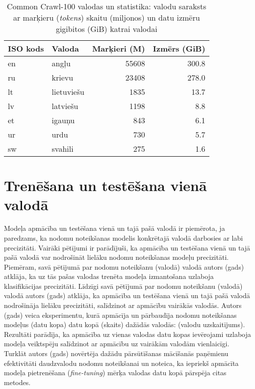 \begin{table}[htbp]
  \centering
  \caption{Common Crawl-100 valodas un statistika: valodu saraksts ar marķieru (\textit{tokens}) skaitu (miljonos) un datu izmēru gigibitos (GiB) katrai valodai}
    \begin{tabular}{llrr} \toprule
    ISO kods &  Valoda & Marķieri (M) & Izmērs (GiB) \\\midrule
    en    &  angļu & 55608 & 300.8 \\
    ru    &  krievu & 23408 & 278.0 \\
    lt    &  lietuviešu & 1835  & 13.7 \\
    lv    &  latviešu & 1198  & 8.8 \\
    et    &  igauņu & 843   & 6.1 \\
    ur    &  urdu & 730   & 5.7 \\
    sw    &  svahili & 275   & 1.6 \\\bottomrule
    \end{tabular}
  \label{tab:cc-100}
\end{table}


\section{Trenēšana un testēšana vienā valodā}

Modeļa apmācība un testēšana vienā un tajā pašā valodā ir piemērota, ja paredzams, ka nodomu noteikšanas modelis konkrētajā valodā darbosies ar labi precizitāti. Vairāki pētījumi ir parādījuši, ka apmācība un testēšana vienā un tajā pašā valodā var nodrošināt lielāku nodomu noteikšanas modeļu precizitāti. Piemēram, savā pētījumā par nodomu noteikšanu (valodā) valodā autors (gads) atklāja, ka uz tās pašas valodas trenēta modeļa izmantošana uzlaboja klasifikācijas precizitāti. Līdzīgi savā pētījumā par nodomu noteikšanu (valodā) valodā autors (gads) atklāja, ka apmācība un testēšana vienā un tajā pašā valodā nodrošināja lielāku precizitāti, salīdzinot ar apmācību vairākās valodās. Autors (gads) veica eksperimentu, kurā apmācīja un pārbaudīja nodomu noteikšanas modeļus (datu kopa) datu kopā (skaits) dažādās valodās: (valodu uzskaitījums). Rezultāti parādīja, ka apmācība uz vienas valodas datu kopas ievērojami uzlaboja modeļa veiktspēju salīdzinot ar apmācību uz vairākām valodām vienlaicīgi. Turklāt autors (gads) novērtēja dažādu pārsūtīšanas mācīšanās paņēmienu efektivitāti daudzvalodu nodomu noteikšanai un noteica, ka iepriekš apmācīta modeļa pietrenēšana (\textit{fine-tuning}) mērķa valodas datu kopā pārspēja citas metodes.

